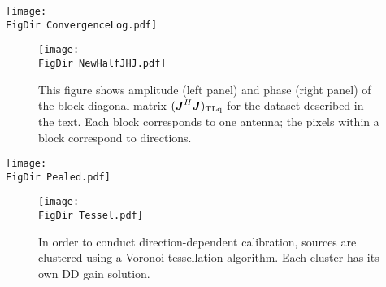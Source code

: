 \documentclass[useAMS,usenatbib]{mn2e}
\newcommand{\mat}[1]{{\bmath{#1}}}
\newcommand{\JJ}{\mat{J}} %
\newcommand{\JHJ}{\JJ^H\JJ} %
\newcommand{\FigDir}{../Figures/}
\newcommand{\COH}{{\sc CohJones}}
\begin{document}
\begin{figure*}
\begin{center}
\texttt{[image: \\FigDir ConvergenceLog.pdf]}
\caption{\label{fig:Convergence} Amplitude (top row) and phase (bottom row) of the difference between
  the estimated and true gains, as a function of iteration. Columns correspond to directions.
  Different lines correspond to different antennas.}
\end{center}
\end{figure*}

\begin{figure}
\begin{center}
\texttt{[image: \\FigDir NewHalfJHJ.pdf]}
\caption{\label{fig:HalfJHJ} This figure shows amplitude (left panel)
  and phase (right panel) of the block-diagonal matrix $(\JHJ)_\UL$
  for the dataset described in the text. Each block corresponds to one antenna;
  the pixels within a block correspond to directions.}
\end{center}
\end{figure}

\begin{figure*}
\begin{center}
\texttt{[image: \\FigDir Pealed.pdf]}
\caption{\label{fig:resid}Simulation with time-variable DD gains. We show a deconvolved image (left) where
  no DD solutions have been applied, a residual image (centre) made by subtracting the sky model (in the visibility 
  plane) without any DD corrections, and a residual image (right) made by subtracting the sky model with \COH-estimated 
  DD gain solutions (right). The color scale is the same in all panels. In this simulation, applying \COH\ for DD calibration reduces the residual rms level by a factor of $\sim30$.}
\end{center}
\end{figure*}

\begin{figure}
\begin{center}
\texttt{[image: \\FigDir Tessel.pdf]}
\caption{\label{fig:tessel} In order to conduct direction-dependent calibration, sources are clustered using a 
Voronoi tessellation algorithm. Each cluster has its own DD gain solution.}
\end{center}
\end{figure}
\end{document}
